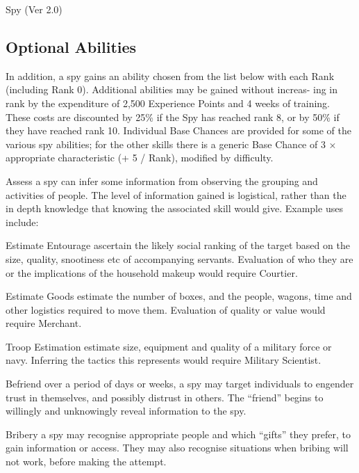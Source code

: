 \begin{Chapter}{Spy (Ver 2.0)}
\subsection{Optional Abilities}

In addition, a spy gains an ability chosen from the list below with
each Rank (including Rank 0).  Additional abilities may be gained
without increas- ing in rank by the expenditure of 2,500 Experience
Points and 4 weeks of training.  These costs are discounted by 25\% if
the Spy has reached rank 8, or by 50\% if they have reached rank
10. Individual Base Chances are provided for some of the various spy
abilities; for the other skills there is a generic Base Chance of 3 ×
appropriate characteristic (+ 5 / Rank), modified by difficulty.

\begin{Description}
\item[Assess] a spy can infer some information from observing the
  grouping and activities of people.  The level of information gained
  is logistical, rather than the in depth knowledge that knowing the
  associated skill would give. Example uses include:
\begin{Itemize}
\item Estimate Entourage ascertain the likely social ranking of the
  target based on the size, quality, snootiness etc of accompanying
  servants.  Evaluation of who they are or the implications of the
  household makeup would require Courtier.

\item Estimate Goods estimate the number of boxes, and the people,
  wagons, time and other logistics required to move them.  Evaluation
  of quality or value would require Merchant.

\item Troop Estimation estimate size, equipment and quality of a
  military force or navy.  Inferring the tactics this represents would
  require Military Scientist.
\end{Itemize}

\item[Befriend] over a period of days or weeks, a spy may target
  individuals to engender trust in themselves, and possibly distrust
  in others. The “friend” begins to willingly and unknowingly reveal
  information to the spy.

\item[Bribery] a spy may recognise appropriate people and which
  “gifts” they prefer, to gain information or access. They may also
  recognise situations when bribing will not work, before making the
  attempt.


\end{Description}
\end{Chapter}
